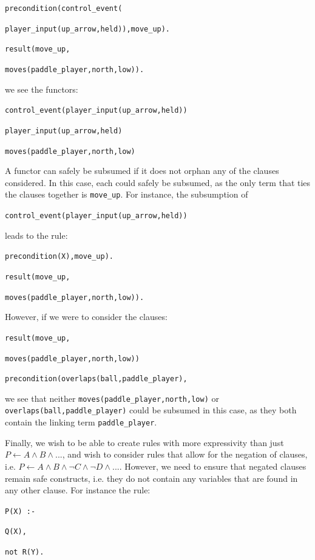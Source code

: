 \documentclass[12pt]{report}
\begin{document}
\noindent \texttt{precondition(control\_event(}

\texttt{player\_input(up\_arrow,held)),move\_up).}

\noindent \texttt{result(move\_up,}

\texttt{moves(paddle\_player,north,low)).}

\noindent we see the functors:

\noindent \texttt{control\_event(player\_input(up\_arrow,held))}

\noindent \texttt{player\_input(up\_arrow,held)}

\noindent \texttt{moves(paddle\_player,north,low)}

A functor can safely be subsumed if it does not orphan any of the clauses considered.  In this case, each could safely be subsumed, as the only term that ties the clauses together is \texttt{move\_up}.  For instance, the subsumption of

\noindent  \texttt{control\_event(player\_input(up\_arrow,held))} 

\noindent leads to the rule:

\noindent \texttt{precondition(X),move\_up).}

\noindent \texttt{result(move\_up,}

\texttt{moves(paddle\_player,north,low)).}

However, if we were to consider the clauses:

\noindent \texttt{result(move\_up,}

\texttt{moves(paddle\_player,north,low))}


\noindent \texttt{precondition(overlaps(ball,paddle\_player),}

\noindent we see that neither \texttt{moves(paddle\_player,north,low)} or \texttt{overlaps(ball,paddle\_player)} could be subsumed in this case, as they both contain the linking term \texttt{paddle\_player}.

Finally, we wish to be able to create rules with more expressivity than just $P \leftarrow A \land B \land ...$, and wish to consider rules that allow for the negation of clauses, i.e. $P \leftarrow A \land B \land \lnot C \land \lnot D \land ...$.  However, we need to ensure that negated clauses remain safe constructs, i.e. they do not contain any variables that are found in any other clause.  For instance the rule:

\noindent \texttt{P(X) :- }

\texttt{Q(X),}

\texttt{not R(Y).}
\end{document}
